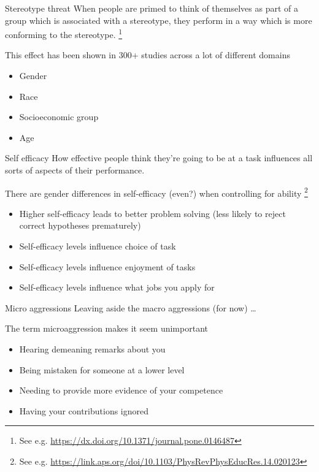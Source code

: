 \documentclass[xcolor=table,aspectratio=169]{beamer}
\begin{document}
\begin{frame}{Stereotype threat}
	When people are primed to think of themselves as part of a group which is associated with a stereotype, they perform in a way which is more conforming to the stereotype. \footnote{See e.g. \url{https://dx.doi.org/10.1371/journal.pone.0146487}}

	\vspace{0.5em}
	This effect has been shown in 300+ studies across a lot of different domains
	\begin{itemize}
		\item Gender
		\item Race
		\item Socioeconomic group
		\item Age
	\end{itemize}
\end{frame}
\begin{frame}{Self efficacy}
How effective people think they're going to be at a task influences all sorts of aspects of their performance.

	\vspace{0.5em}

There are gender differences in self-efficacy (even?) when controlling for ability \footnote{See e.g. \url{https://link.aps.org/doi/10.1103/PhysRevPhysEducRes.14.020123}}
	\begin{itemize}
		\item Higher self-efficacy leads to better problem solving (less likely to reject correct hypotheses prematurely)
		\item Self-efficacy levels influence choice of task
		\item Self-efficacy levels influence enjoyment of tasks
		\item Self-efficacy levels influence what jobs you apply for
	\end{itemize}
\end{frame}
\begin{frame}{Micro aggressions}
	Leaving aside the macro aggressions (for now) \ldots
	
	\vspace{0.5em}

	The term microaggression makes it seem unimportant

	\begin{itemize}
		\item Hearing demeaning remarks about you
		\item Being mistaken for someone at a lower level
		\item Needing to provide more evidence of your competence
		\item Having your contributions ignored
	\end{itemize}
\end{frame}
\end{document}
